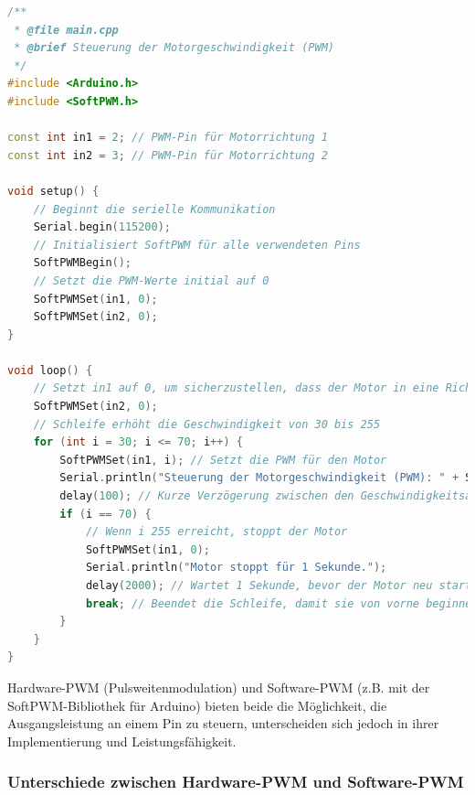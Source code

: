 \documentclass{vorlage-design-main}
\begin{document}
\begin{lstlisting}[language={C++}]
/**
 * @file main.cpp
 * @brief Steuerung der Motorgeschwindigkeit (PWM)
 */
#include <Arduino.h>
#include <SoftPWM.h>

const int in1 = 2; // PWM-Pin für Motorrichtung 1
const int in2 = 3; // PWM-Pin für Motorrichtung 2

void setup() {
    // Beginnt die serielle Kommunikation
    Serial.begin(115200);
    // Initialisiert SoftPWM für alle verwendeten Pins
    SoftPWMBegin();
    // Setzt die PWM-Werte initial auf 0
    SoftPWMSet(in1, 0);
    SoftPWMSet(in2, 0);
}

void loop() {
    // Setzt in1 auf 0, um sicherzustellen, dass der Motor in eine Richtung dreht
    SoftPWMSet(in2, 0);
    // Schleife erhöht die Geschwindigkeit von 30 bis 255
    for (int i = 30; i <= 70; i++) {
        SoftPWMSet(in1, i); // Setzt die PWM für den Motor
        Serial.println("Steuerung der Motorgeschwindigkeit (PWM): " + String(i));
        delay(100); // Kurze Verzögerung zwischen den Geschwindigkeitsänderungen
        if (i == 70) {
            // Wenn i 255 erreicht, stoppt der Motor
            SoftPWMSet(in1, 0);
            Serial.println("Motor stoppt für 1 Sekunde.");
            delay(2000); // Wartet 1 Sekunde, bevor der Motor neu startet
            break; // Beendet die Schleife, damit sie von vorne beginnen kann
        }
    }
}
\end{lstlisting}

Hardware-PWM (Pulsweitenmodulation) und Software-PWM (z.B. mit der
SoftPWM-Bibliothek für Arduino) bieten beide die Möglichkeit, die
Ausgangsleistung an einem Pin zu steuern, unterscheiden sich jedoch in
ihrer Implementierung und Leistungsfähigkeit.

\hypertarget{unterschiede-zwischen-hardware-pwm-und-software-pwm}{%
\subsubsection{Unterschiede zwischen Hardware-PWM und
Software-PWM}\label{unterschiede-zwischen-hardware-pwm-und-software-pwm}}
\end{document}
